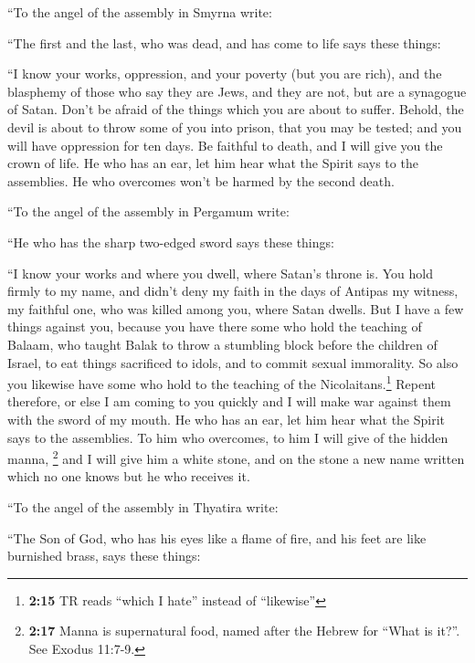  ``To the angel of the assembly in Smyrna write:

``The first and the last, who was dead, and has come to life says these
things:

 ``I know your works, oppression, and your poverty (but
you are rich), and the blasphemy of those who say they are Jews, and
they are not, but are a synagogue of Satan.  Don't be
afraid of the things which you are about to suffer. Behold, the devil is
about to throw some of you into prison, that you may be tested; and you
will have oppression for ten days. Be faithful to death, and I will give
you the crown of life.  He who has an ear, let him hear
what the Spirit says to the assemblies. He who overcomes won't be harmed
by the second death.

 ``To the angel of the assembly in Pergamum write:

``He who has the sharp two-edged sword says these things:

 ``I know your works and where you dwell, where Satan's
throne is. You hold firmly to my name, and didn't deny my faith in the
days of Antipas my witness, my faithful one, who was killed among you,
where Satan dwells.  But I have a few things against you,
because you have there some who hold the teaching of Balaam, who taught
Balak to throw a stumbling block before the children of Israel, to eat
things sacrificed to idols, and to commit sexual immorality.
 So also you likewise have some who hold to the teaching
of the Nicolaitans.\footnote{\textbf{2:15} TR reads ``which I hate''
  instead of ``likewise''}  Repent therefore, or else I
am coming to you quickly and I will make war against them with the sword
of my mouth.  He who has an ear, let him hear what the
Spirit says to the assemblies. To him who overcomes, to him I will give
of the hidden manna, \footnote{\textbf{2:17} Manna is supernatural food,
  named after the Hebrew for ``What is it?''. See Exodus 11:7-9.} and I
will give him a white stone, and on the stone a new name written which
no one knows but he who receives it.

 ``To the angel of the assembly in Thyatira write:

``The Son of God, who has his eyes like a flame of fire, and his feet
are like burnished brass, says these things:

